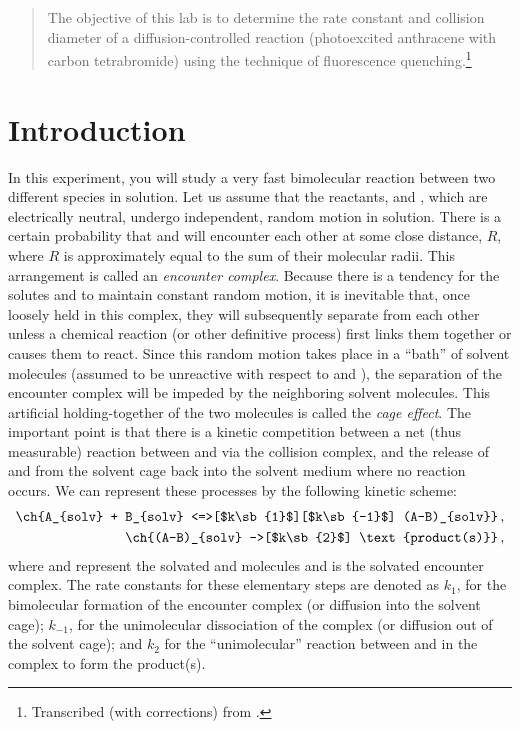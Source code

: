 \maketitle %

\begin{abstract}
\noindent
The objective of this lab is to determine the rate constant and collision diameter of a diffusion-controlled reaction (photoexcited anthracene with carbon tetrabromide) using the technique of fluorescence quenching.\thanks{Transcribed (with corrections) from \textcite{halpern97}.}
\end{abstract}

\section{Introduction} %
\label{sec:intro}

In this experiment, you will study a very fast bimolecular reaction between two different species in solution. 
Let us assume that the reactants,  and , which are electrically neutral, undergo independent, random motion in solution. 
There is a certain probability that  and  will encounter each other at some close distance, \(R\), where \(R\) is approximately equal to the sum of their molecular radii. 
This arrangement is called an \emph{encounter complex}. 
Because there is a tendency for the solutes  and  to maintain constant random motion, it is inevitable that, once
loosely held in this complex, they will subsequently separate from each other unless a chemical
reaction (or other definitive process) first links them together or causes them to react. 
Since this random motion takes place in a ``bath'' of solvent molecules (assumed to be unreactive with respect
to  and ), the separation of the  encounter complex will be impeded by the neighboring
solvent molecules. 
This artificial holding-together of the two molecules is called the \emph{cage effect}.
The important point is that there is a kinetic competition between a net (thus measurable) reaction
between  and  via the collision complex, and the release of  and  from the solvent cage back
into the solvent medium where no reaction occurs. 
We can represent these processes by the following kinetic scheme:
\begin{align}
\begin{split}
	\ch{A_{solv} + B_{solv} <=>[$k\sb{1}$][$k\sb{-1}$] (A-B)_{solv}} \, , \\
	\ch{(A-B)_{solv} ->[$k\sb{2}$] \text{product(s)}} \, ,
\end{split}
\label{eq:rxn_scheme}
\end{align}
where  and  represent the solvated  and  molecules and  is the solvated encounter complex. 
The rate constants for these elementary steps are denoted as \( k_1 \), for the bimolecular formation of the encounter complex (or diffusion into the solvent cage); \( k_{-1} \), for the unimolecular dissociation of the complex (or diffusion out of the solvent cage); and \( k_2 \) for the ``unimolecular'' reaction between  and  in the complex to form the product(s). 

